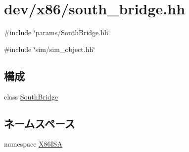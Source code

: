 \hypertarget{south__bridge_8hh}{
\section{dev/x86/south\_\-bridge.hh}
\label{south__bridge_8hh}
}
{\ttfamily \#include \char`\"{}params/SouthBridge.hh\char`\"{}}\par
{\ttfamily \#include \char`\"{}sim/sim\_\-object.hh\char`\"{}}\par
\subsection*{構成}
\begin{DoxyCompactItemize}
\item 
class \hyperlink{classSouthBridge}{SouthBridge}
\end{DoxyCompactItemize}
\subsection*{ネームスペース}
\begin{DoxyCompactItemize}
\item 
namespace \hyperlink{namespaceX86ISA}{X86ISA}
\end{DoxyCompactItemize}
